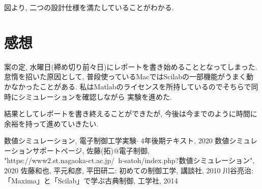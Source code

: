 \documentclass[titlepage]{jsarticle}
\begin{document}
            図より, 二つの設計仕様を満たしていることがわかる.

\section{感想}
    案の定, 水曜日(締め切り前々日)にレポートを書き始めることとなってしまった.
    怠惰を招いた原因として,
    普段使っているMacではScilabの一部機能がうまく動かなかったことがある.
    私はMatlabのライセンスを所持しているのでそちらで同時にシミュレーションを確認しながら
    実験を進めた.

    結果としてレポートを書き終えることができたが,
    今後は今までのように時間に余裕を持って進めていきたい.

\begin{thebibliography}{99}
     数値シミュレーション, 電子制御工学実験$\cdot$ 4年後期テキスト, 2020
     数値シミュレーションサポートページ, 佐藤(拓)@電子制御, \\
        "https://www2.st.nagaoka-ct.ac.jp/~h-satoh/index.php?数値シミュレーション", 2020
     佐藤和也, 平元和彦, 平田研二: 初めての制御工学, 講談社, 2010
     川谷亮治: 「Maxima」と「Scilab」で学ぶ古典制御, 工学社, 2014
\end{thebibliography}
\end{document}

